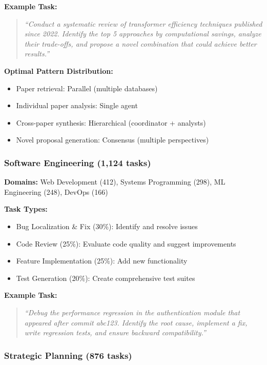 \documentclass{article}
\theoremstyle{plain}
\theoremstyle{definition}
\theoremstyle{remark}
\begin{document}
\textbf{Example Task:}
\begin{quote}
	\textit{``Conduct a systematic review of transformer efficiency techniques published since 2022. Identify the top 5 approaches by computational savings, analyze their trade-offs, and propose a novel combination that could achieve better results.''}
\end{quote}

\textbf{Optimal Pattern Distribution:}
\begin{itemize}[nosep]
	\item Paper retrieval: Parallel (multiple databases)
	\item Individual paper analysis: Single agent
	\item Cross-paper synthesis: Hierarchical (coordinator + analysts)
	\item Novel proposal generation: Consensus (multiple perspectives)
\end{itemize}

\subsubsection{Software Engineering (1,124 tasks)}

\textbf{Domains:} Web Development (412), Systems Programming (298), ML Engineering (248), DevOps (166)

\textbf{Task Types:}
\begin{itemize}[nosep]
	\item Bug Localization \& Fix (30\%): Identify and resolve issues
	\item Code Review (25\%): Evaluate code quality and suggest improvements
	\item Feature Implementation (25\%): Add new functionality
	\item Test Generation (20\%): Create comprehensive test suites
\end{itemize}

\textbf{Example Task:}
\begin{quote}
	\textit{``Debug the performance regression in the authentication module that appeared after commit abc123. Identify the root cause, implement a fix, write regression tests, and ensure backward compatibility.''}
\end{quote}

\subsubsection{Strategic Planning (876 tasks)}
\end{document}
